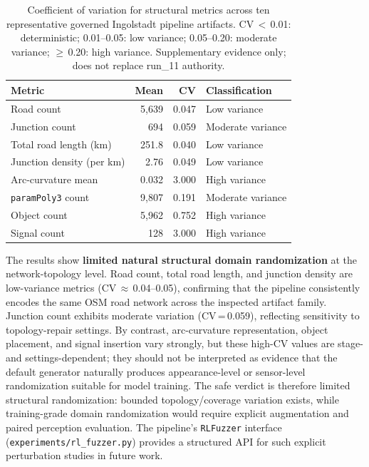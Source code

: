 \begin{table}[ht]
\centering
\caption[Structural CV across ten governed pipeline artifacts.]{Coefficient of variation for structural metrics across ten representative governed Ingolstadt pipeline artifacts. CV\,$<$\,0.01: deterministic; 0.01--0.05: low variance; 0.05--0.20: moderate variance; $\geq$\,0.20: high variance. Supplementary evidence only; does not replace run\_11 authority.}
\label{tab:domain_randomization_cv}
\small
\begin{tabular}{lrrl}
\hline
Metric & Mean & CV & Classification \\
\hline
Road count & 5{,}639 & 0.047 & Low variance \\
Junction count & 694 & 0.059 & Moderate variance \\
Total road length (km) & 251.8 & 0.040 & Low variance \\
Junction density (per km) & 2.76 & 0.049 & Low variance \\
Arc-curvature mean & 0.032 & 3.000 & High variance \\
\texttt{paramPoly3} count & 9{,}807 & 0.191 & Moderate variance \\
Object count & 5{,}962 & 0.752 & High variance \\
Signal count & 128 & 3.000 & High variance \\
\hline
\end{tabular}
\end{table}

The results show \textbf{limited natural structural domain randomization} at the network-topology level. Road count, total road length, and junction density are low-variance metrics (CV\,$\approx$\,0.04--0.05), confirming that the pipeline consistently encodes the same OSM road network across the inspected artifact family. Junction count exhibits moderate variation (CV\,=\,0.059), reflecting sensitivity to topology-repair settings. By contrast, arc-curvature representation, object placement, and signal insertion vary strongly, but these high-CV values are stage- and settings-dependent; they should not be interpreted as evidence that the default generator naturally produces appearance-level or sensor-level randomization suitable for model training. The safe verdict is therefore limited structural randomization: bounded topology/coverage variation exists, while training-grade domain randomization would require explicit augmentation and paired perception evaluation. The pipeline's \texttt{RLFuzzer} interface (\texttt{experiments/rl\_fuzzer.py}) provides a structured API for such explicit perturbation studies in future work.

